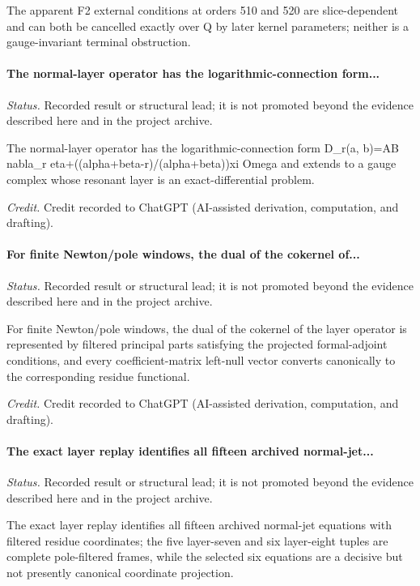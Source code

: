 The apparent F2 external conditions at orders 510 and 520 are slice-dependent and can both be cancelled exactly over Q by later kernel parameters; neither is a gauge-invariant terminal obstruction.

\label{supp-note-06-035}
\paragraph{The normal-layer operator has the logarithmic-connection form...}
\emph{Status.} Recorded result or structural lead; it is not promoted beyond the evidence described here and in the project archive.

The normal-layer operator has the logarithmic-connection form D\_r(a, b)=AB nabla\_r eta+((alpha+beta-r)/(alpha+beta))xi Omega and extends to a gauge complex whose resonant layer is an exact-differential problem.

\emph{Credit.} Credit recorded to ChatGPT (AI-assisted derivation, computation, and drafting).

\label{supp-note-06-036}
\paragraph{For finite Newton/pole windows, the dual of the cokernel of...}
\emph{Status.} Recorded result or structural lead; it is not promoted beyond the evidence described here and in the project archive.

For finite Newton/pole windows, the dual of the cokernel of the layer operator is represented by filtered principal parts satisfying the projected formal-adjoint conditions, and every coefficient-matrix left-null vector converts canonically to the corresponding residue functional.

\emph{Credit.} Credit recorded to ChatGPT (AI-assisted derivation, computation, and drafting).

\label{supp-note-06-037}
\paragraph{The exact layer replay identifies all fifteen archived normal-jet...}
\emph{Status.} Recorded result or structural lead; it is not promoted beyond the evidence described here and in the project archive.

The exact layer replay identifies all fifteen archived normal-jet equations with filtered residue coordinates; the five layer-seven and six layer-eight tuples are complete pole-filtered frames, while the selected six equations are a decisive but not presently canonical coordinate projection.

